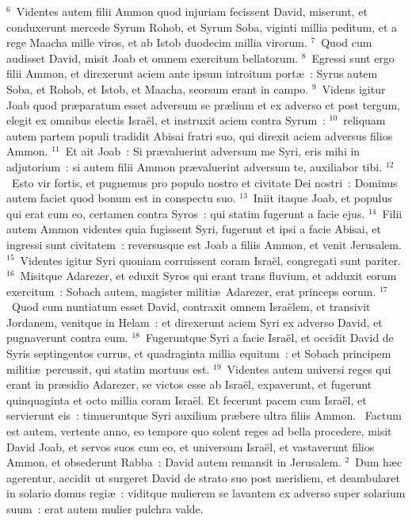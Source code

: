 ${}^{6}$~Videntes autem filii Ammon quod injuriam fecissent David, miserunt, et conduxerunt mercede Syrum Rohob, et Syrum Soba, viginti millia peditum, et a rege Maacha mille viros, et ab Istob duodecim millia virorum.
${}^{7}$~Quod cum audisset David, misit Joab et omnem exercitum bellatorum.
${}^{8}$~Egressi sunt ergo filii Ammon, et direxerunt aciem ante ipsum introitum port\ae~: Syrus autem Soba, et Rohob, et Istob, et Maacha, seorsum erant in campo.
${}^{9}$~Videns igitur Joab quod pr\ae paratum esset adversum se pr\ae lium et ex adverso et post tergum, elegit ex omnibus electis Isra\"el, et instruxit aciem contra Syrum~:
${}^{10}$~reliquam autem partem populi tradidit Abisai fratri suo, qui direxit aciem adversus filios Ammon.
${}^{11}$~Et ait Joab~: Si pr\ae valuerint adversum me Syri, eris mihi in adjutorium~: si autem filii Ammon pr\ae valuerint adversum te, auxiliabor tibi.
${}^{12}$~Esto vir fortis, et pugnemus pro populo nostro et civitate Dei nostri~: Dominus autem faciet quod bonum est in conspectu suo.
${}^{13}$~Iniit itaque Joab, et populus qui erat cum eo, certamen contra Syros~: qui statim fugerunt a facie ejus.
${}^{14}$~Filii autem Ammon videntes quia fugissent Syri, fugerunt et ipsi a facie Abisai, et ingressi sunt civitatem~: reversusque est Joab a filiis Ammon, et venit Jerusalem.
${}^{15}$~Videntes igitur Syri quoniam corruissent coram Isra\"el, congregati sunt pariter.
${}^{16}$~Misitque Adarezer, et eduxit Syros qui erant trans fluvium, et adduxit eorum exercitum~: Sobach autem, magister militi\ae\ Adarezer, erat princeps eorum.
${}^{17}$~Quod cum nuntiatum esset David, contraxit omnem Isra\"elem, et transivit Jordanem, venitque in Helam~: et direxerunt aciem Syri ex adverso David, et pugnaverunt contra eum.
${}^{18}$~Fugeruntque Syri a facie Isra\"el, et occidit David de Syris septingentos currus, et quadraginta millia equitum~: et Sobach principem militi\ae\ percussit, qui statim mortuus est.
${}^{19}$~Videntes autem universi reges qui erant in pr\ae sidio Adarezer, se victos esse ab Isra\"el, expaverunt, et fugerunt quinquaginta et octo millia coram Isra\"el. Et fecerunt pacem cum Isra\"el, et servierunt eis~: timueruntque Syri auxilium pr\ae bere ultra filiis Ammon.
~Factum est autem, vertente anno, eo tempore quo solent reges ad bella procedere, misit David Joab, et servos suos cum eo, et universum Isra\"el, et vastaverunt filios Ammon, et obsederunt Rabba~: David autem remansit in Jerusalem.
${}^{2}$~Dum h\ae c agerentur, accidit ut surgeret David de strato suo post meridiem, et deambularet in solario domus regi\ae~: viditque mulierem se lavantem ex adverso super solarium suum~: erat autem mulier pulchra valde.
